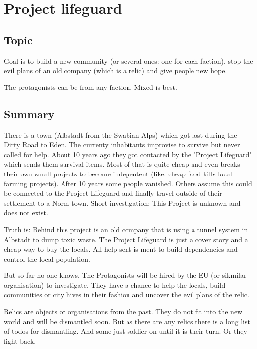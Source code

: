 \chapter{Project lifeguard}
\label{ch:project lifeguard}

\section{Topic}

Goal is to build a new community (or several ones: one for each faction), stop the evil plans of an old company (which is a relic) and give people new hope.

The protagonists can be from any faction. Mixed is best.

\section{Summary}

There is a town (Albstadt from the Swabian Alps) which got lost during the Dirty Road to Eden. The currenty inhabitants improvise to survive but never called for help. About 10 years ago they got contacted by the "Project Lifeguard" which sends them survival items. Most of that is quite cheap and even breaks their own small projects to become indepentent (like: cheap food kills local farming projects). After 10 years some people vanished. Others assume this could be connected to the Project Lifeguard and finally travel outside of their settlement to a Norm town. Short investigation: This Project is unknown and does not exist.


Truth is: Behind this project is an old company that is using a tunnel system in Albstadt to dump toxic waste. The Project Lifeguard is just a  cover story and a cheap way to buy the locals. All help sent is ment to build dependencies and control the local population.

But so far no one knows. The Protagonists will be hired by the EU (or sikmilar organisation) to investigate. They have a chance to help the locals, build communities or city hives in their fashion and uncover the evil plans of the relic.

\begin{sidebarBox}[title=Relics]
Relics are objects or organisations from the past. They do not fit into the new world and will be dismantled soon. But as there are any relics there is a long list of todos for dismantling. And some just soldier on until it is their turn. Or they fight back.
\end{sidebarBox}

